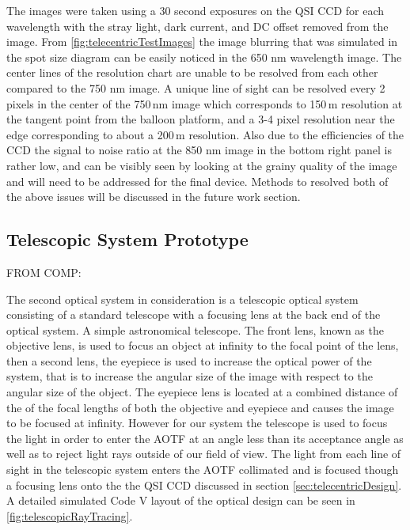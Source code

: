 The images were taken using a 30 second exposures on the QSI CCD for each wavelength with the stray light, dark current, and DC offset removed from the image. From \autoref{fig:telecentricTestImages} the image blurring that was simulated in the spot size diagram can be easily noticed in the 650 nm wavelength image. The center lines of the resolution chart are unable to be resolved from each other compared to the 750 nm image. A unique line of sight can be resolved every 2 pixels in the center of the 750\,nm image which corresponds to 150\,m resolution at the tangent point from the balloon platform, and a 3-4 pixel resolution near the edge corresponding to about a 200\,m resolution. Also due to the efficiencies of the CCD the signal to noise ratio at the 850 nm image in the bottom right panel is rather low, and can be visibly seen by looking at the grainy quality of the image and will need to be addressed for the final device. Methods to resolved both of the above issues will be discussed in the future work section.

\subsection{Telescopic System Prototype}

FROM COMP:

The second optical system in consideration is a telescopic optical system consisting of a standard telescope with a focusing lens at the back end of the optical system. A simple astronomical telescope. The front lens, known as the objective lens, is used to focus an object at infinity to the focal point of the lens, then a second lens, the eyepiece is used to increase the optical power of the system, that is to increase the angular size of the image with respect to the angular size of the object. The eyepiece lens is located at a combined distance of the of the focal lengths of both the objective and eyepiece and causes the image to be focused at infinity. However for our system the telescope is used to focus the light in order to enter the AOTF at an angle less than its acceptance angle as well as to reject light rays outside of our field of view. The light from each line of sight in the telescopic system enters the AOTF collimated and is focused though a focusing lens onto the the QSI CCD discussed in section \autoref{sec:telecentricDesign}. A detailed simulated Code V layout of the optical design can be seen in \autoref{fig:telescopicRayTracing}.


